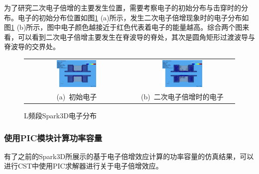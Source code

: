 \documentclass[master]{thesis-uestc}
\begin{document}
为了研究二次电子倍增的主要发生位置，需要考察电子的初始分布与击穿时的分布。电子的初始分布位置如图\ref{fig:L频段Spark3D电子的击穿位置} (a)所示，发生二次电子倍增现象时的电子分布如图\ref{fig:L频段Spark3D电子的击穿位置} (b)所示，图中电子颜色越接近于红色代表着电子的能量越高。综合两个图来看，可以看到二次电子倍增主要发生在脊波导的脊处，其次是圆角矩形过渡波导与脊波导的交界处。
\begin{figure}[!htb]
    \small
    \centering
    \begin{tabular}{@{\ }c@{\ }c}
        \includegraphics[width=0.4\textwidth]{pic/chapter4/LSP3D电子初始位置.png} & 
        \hspace{5pt}
        \includegraphics[width=0.4\textwidth]{pic/chapter4/LSP3D电子击穿时的位置.png}     \\
        \mbox{\small (a) 初始电子}                                                                               & 
        \mbox{\small (b) 二次电子倍增时的电子}                                                                                  \\
    \end{tabular}
    \caption{L频段Spark3D电子分布}
    \label{fig:L频段Spark3D电子的击穿位置}
\end{figure}

\subsubsection{使用PIC模块计算功率容量}
有了之前的Spark3D所展示的基于电子倍增效应计算的功率容量的仿真结果，可以进行CST中使用PIC求解器进行关于电子倍增效应。
\end{document}
